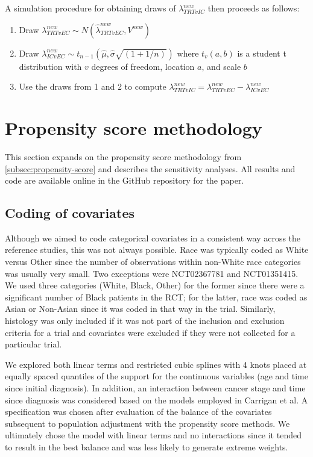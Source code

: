 \documentclass[11pt,final,fleqn]{article}\usepackage[]{graphicx}\usepackage[]{color}
\begin{document}
A simulation procedure for obtaining draws of $\lambda_{TRTvIC}^{new}$ then proceeds as follows:

\begin{enumerate}
\item Draw $\lambda_{TRTvEC}^{new} \sim N(\hat{\lambda}_{TRTvEC}^{new}, V^{new})$ 

\item Draw $\lambda_{ICvEC}^{new} \sim t_{n-1}(\hat{\mu}, \hat{\sigma}\sqrt{(1 + 1/n)})$ where $t_v(a, b)$ is a student t distribution with $v$ degrees of freedom, location $a$, and scale $b$

\item Use the draws from 1 and 2 to compute $\lambda_{TRTvIC}^{new} =  \lambda_{TRTvEC}^{new} - \lambda_{ICvEC}^{new}$
\end{enumerate}

\section{Propensity score methodology} \label{appendix:ps}
This section expands on the propensity score methodology from \autoref{subsec:propensity-score} and describes the sensitivity analyses. All results and code are available online in the GitHub repository for the paper.

\subsection{Coding of covariates}
Although we aimed to code categorical covariates in a consistent way across the reference studies, this was not always possible. Race was typically coded as White versus Other since the number of observations within non-White race categories was usually very small. Two exceptions were NCT02367781 and NCT01351415. We used three categories (White, Black, Other) for the former since there were a significant number of Black patients in the RCT; for the latter, race was coded as Asian or Non-Asian since it was coded in that way in the trial. Similarly, histology was only included if it was not part of the inclusion and exclusion criteria for a trial and covariates were excluded if they were not collected for a particular trial.

We explored both linear terms and restricted cubic splines with 4 knots placed at equally spaced quantiles of the support for the continuous variables (age and time since initial diagnosis). In addition, an interaction between cancer stage and time since diagnosis was considered based on the models employed in Carrigan et al.\cite{carrigan2020using} A specification was chosen after evaluation of the balance of the covariates subsequent to population adjustment with the propensity score methods. We ultimately chose the model with linear terms and no interactions since it tended to  result in the best balance and was less likely to generate extreme weights. 
\end{document}

